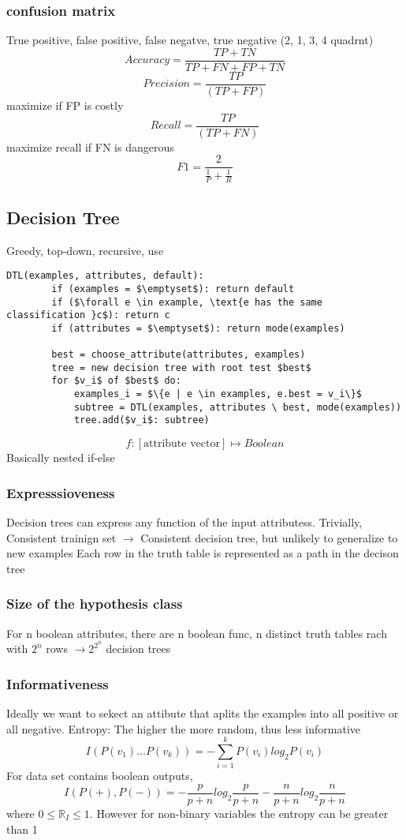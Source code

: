 \documentclass{article}
\begin{document}
\subsubsection*{confusion matrix}
True positive, false positive, false negatve, true negative (2, 1, 3, 4 quadrnt)\newline
\[Accuracy = \frac{TP + TN}{TP + FN + FP + TN}\]
\[Precision = \frac{TP}{(TP + FP)}\]
maximize if FP is costly
\[Recall = \frac{TP}{(TP + FN)}\]
maximize recall if FN is dangerous
\[F1 = \frac{2}{\frac{1}{P} + \frac{1}{R}}\]


\subsection[Supervised]{Decision Tree}
Greedy, top-down, recursive, use
\begin{lstlisting}[mathescape=true]
    DTL(examples, attributes, default):
        if (examples = $\emptyset$): return default
        if ($\forall e \in example, \text{e has the same classification }c$): return c
        if (attributes = $\emptyset$): return mode(examples)

        best = choose_attribute(attributes, examples)
        tree = new decision tree with root test $best$
        for $v_i$ of $best$ do:
            examples_i = $\{e | e \in examples, e.best = v_i\}$
            subtree = DTL(examples, attributes \ best, mode(examples))
            tree.add($v_i$: subtree)
    \end{lstlisting}
\[f: [\text{attribute vector}] \mapsto Boolean\]
Basically nested if-else 

\subsubsection*{Expresssioveness }
Decision trees can express any function of the input attributess. Trivially, Consistent trainign set $\rightarrow$ Consistent decision tree, but unlikely to generalize to new examples\newline
Each row in the truth table is represented as a path in the decison tree 
\subsubsection*{Size of the hypothesis class}
For n boolean attributes, there are n boolean func, n distinct truth tables rach with $2^n$ rows $\rightarrow 2^{2^n}$ decision trees
\subsubsection*{Informativeness}
Ideally we want to sekect an attibute that aplits the examples into all positive or all negative.\newline
Entropy: The higher the more random, thus less informative
\[I(P(v_1)...P(v_k)) = -\sum_{i=1}^{k} P(v_i)log_2P(v_i)\]
For data set contains boolean outputs, 
\[I(P(+), P(-)) = -\frac{p}{p + n}log_2 \frac{p}{p + n} - \frac{n}{p+n}log_2\frac{n}{p+n}\]
where $0 \leq \mathbb{R}_I \leq 1$. However for non-binary variables the entropy can be greater than 1
\end{document}
